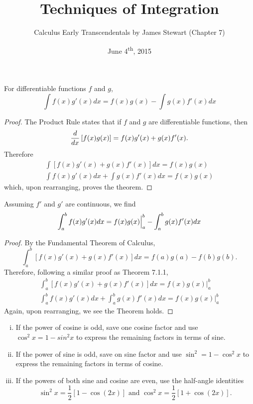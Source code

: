 \documentclass[a4paper,11pt]{article}
\title{Techniques of Integration}
\author{Calculus Early Transcendentals by James Stewart (Chapter 7)}
\date{June 4\textsuperscript{th}, 2015}
\begin{document}
\maketitle
{}

\begin{outline}

    For differentiable functions \(f\) and \(g\), \[ \int f(x)g'(x)dx = f(x)g(x) - \int g(x)f'(x)dx \]
    
    \begin{proof}
      The Product Rule states that if \(f\) and \(g\) are differentiable functions, then
      \[
        \frac{d}{dx}\left[f(x)g(x)\right] = f(x)g'(x) + g(x)f'(x)\text{.}
      \]
      Therefore
      \begin{gather*}
        \int\left[f(x)g'(x)+g(x)f'(x)\right]dx = f(x)g(x) \\
        \int f(x)g'(x)dx + \int g(x)f'(x)dx = f(x)g(x)
      \end{gather*}
      which, upon rearranging, proves the theorem.
    \end{proof}
    
    Assuming \(f'\) and \(g'\) are continuous, we find
    \[
      \int_a^b f(x)g'(x)dx = f(x)g(x)\Big{\vert}_a^b - \int_a^b g(x)f'(x)dx 
    \]
    
    \begin{proof}
      By the Fundamental Theorem of Calculus, 
      \[
        \int_a^b\left[f(x)g'(x)+g(x)f'(x)\right]dx = f(a)g(a) - f(b)g(b)\text{.}
      \]
      Therefore, following a similar proof as Theorem 7.1.1,
      \begin{gather*}
        \int_a^b\left[f(x)g'(x)+g(x)f'(x)\right]dx = f(x)g(x)\Big\vert_a^b \\
        \int_a^b f(x)g'(x)dx + \int_a^b g(x)f'(x)dx = f(x)g(x)\Big\vert_a^b
      \end{gather*}
      Again, upon rearranging, we see the Theorem holds.
    \end{proof}
    
    \begin{enumerate}[i.]
      \item
        If the power of cosine is odd, save one cosine factor and use \(\cos^2x=1-sin^2x\) to express the remaining
        factors in terms of sine.
      \item
        If the power of sine is odd, save on sine factor and use \(\sin^2=1-\cos^2x\) to express the remaining
        factors in terms of cosine.
      \item
        If the powers of both sine and cosine are even, use the half-angle identities 
        \[\sin^2x = \frac{1}{2}[1-\cos{(2x)}] \text{ and } \cos^2x = \frac{1}{2}[1+\cos{(2x)}]\text{.}\]
    \end{enumerate}
    

\end{outline}
\end{document}
